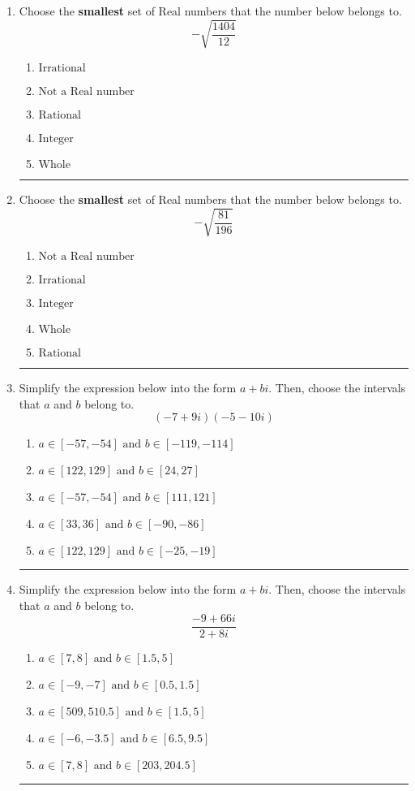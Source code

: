 \documentclass[14pt]{extbook}
\newcommand{\litem}[1]{\item#1\hspace*{-1cm}\rule{\textwidth}{0.4pt}}
\begin{document}
\begin{enumerate}
\litem{
Choose the \textbf{smallest} set of Real numbers that the number below belongs to.\[ -\sqrt{\frac{1404}{12}} \]\begin{enumerate}[label=\Alph*.]
\item \( \text{Irrational} \)
\item \( \text{Not a Real number} \)
\item \( \text{Rational} \)
\item \( \text{Integer} \)
\item \( \text{Whole} \)

\end{enumerate} }
\litem{
Choose the \textbf{smallest} set of Real numbers that the number below belongs to.\[ -\sqrt{\frac{81}{196}} \]\begin{enumerate}[label=\Alph*.]
\item \( \text{Not a Real number} \)
\item \( \text{Irrational} \)
\item \( \text{Integer} \)
\item \( \text{Whole} \)
\item \( \text{Rational} \)

\end{enumerate} }
\litem{
Simplify the expression below into the form $a+bi$. Then, choose the intervals that $a$ and $b$ belong to.\[ (-7 + 9 i)(-5 - 10 i) \]\begin{enumerate}[label=\Alph*.]
\item \( a \in [-57, -54] \text{ and } b \in [-119, -114] \)
\item \( a \in [122, 129] \text{ and } b \in [24, 27] \)
\item \( a \in [-57, -54] \text{ and } b \in [111, 121] \)
\item \( a \in [33, 36] \text{ and } b \in [-90, -86] \)
\item \( a \in [122, 129] \text{ and } b \in [-25, -19] \)

\end{enumerate} }
\litem{
Simplify the expression below into the form $a+bi$. Then, choose the intervals that $a$ and $b$ belong to.\[ \frac{-9 + 66 i}{2 + 8 i} \]\begin{enumerate}[label=\Alph*.]
\item \( a \in [7, 8] \text{ and } b \in [1.5, 5] \)
\item \( a \in [-9, -7] \text{ and } b \in [0.5, 1.5] \)
\item \( a \in [509, 510.5] \text{ and } b \in [1.5, 5] \)
\item \( a \in [-6, -3.5] \text{ and } b \in [6.5, 9.5] \)
\item \( a \in [7, 8] \text{ and } b \in [203, 204.5] \)


\end{enumerate}}
\end{enumerate}
\end{document}
